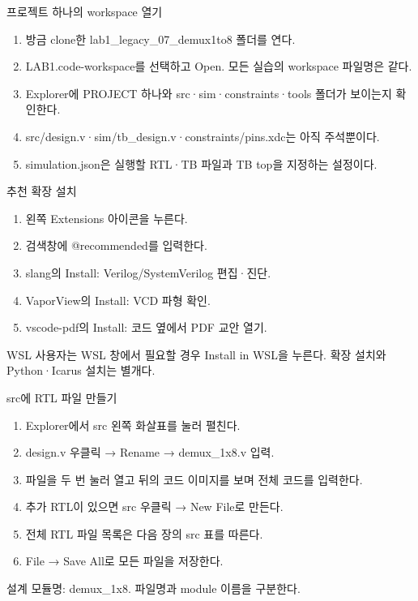 \begin{frame}{프로젝트 하나의 workspace 열기}\relax
\small
\begin{enumerate}\setlength{\itemsep}{0.22cm}
\item 방금 clone한 lab1\_legacy\_07\_demux1to8 폴더를 연다.
\item LAB1.code-workspace를 선택하고 Open. 모든 실습의 workspace 파일명은 같다.
\item Explorer에 PROJECT 하나와 src·sim·constraints·tools 폴더가 보이는지 확인한다.
\item src/design.v·sim/tb\_design.v·constraints/pins.xdc는 아직 주석뿐이다.
\item simulation.json은 실행할 RTL·TB 파일과 TB top을 지정하는 설정이다.
\end{enumerate}

\end{frame}

\begin{frame}{추천 확장 설치}\relax
\small
\begin{enumerate}\setlength{\itemsep}{0.22cm}
\item 왼쪽 Extensions 아이콘을 누른다.
\item 검색창에 @recommended를 입력한다.
\item slang의 Install: Verilog/SystemVerilog 편집·진단.
\item VaporView의 Install: VCD 파형 확인.
\item vscode-pdf의 Install: 코드 옆에서 PDF 교안 열기.
\end{enumerate}
WSL 사용자는 WSL 창에서 필요할 경우 Install in WSL을 누른다. 확장 설치와 Python·Icarus 설치는 별개다.\par
\end{frame}

\begin{frame}{src에 RTL 파일 만들기}\relax
\small
\begin{enumerate}\setlength{\itemsep}{0.22cm}
\item Explorer에서 src 왼쪽 화살표를 눌러 펼친다.
\item design.v 우클릭 → Rename → demux\_1x8.v 입력.
\item 파일을 두 번 눌러 열고 뒤의 코드 이미지를 보며 전체 코드를 입력한다.
\item 추가 RTL이 있으면 src 우클릭 → New File로 만든다.
\item 전체 RTL 파일 목록은 다음 장의 src 표를 따른다.
\item File → Save All로 모든 파일을 저장한다.
\end{enumerate}
설계 모듈명: demux\_1x8. 파일명과 module 이름을 구분한다.\par
\end{frame}

